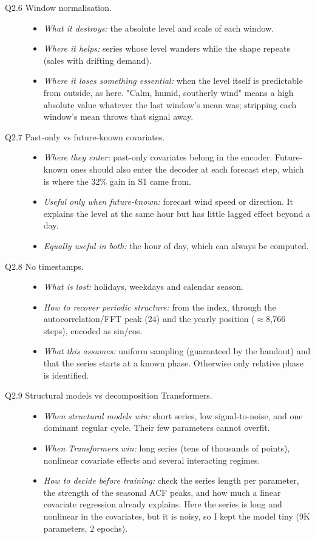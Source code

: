 \begin{description}
\item[Q2.6 Window normalisation.]
\begin{itemize}
\item \emph{What it destroys:} the absolute level and scale of each window.
\item \emph{Where it helps:} series whose level wanders while the shape repeats (sales with drifting demand).
\item \emph{Where it loses something essential:} when the level itself is predictable from outside, as here. "Calm, humid, southerly wind" means a high absolute value whatever the last window's mean was; stripping each window's mean throws that signal away.
\end{itemize}

\item[Q2.7 Past-only vs future-known covariates.]
\begin{itemize}
\item \emph{Where they enter:} past-only covariates belong in the encoder. Future-known ones should also enter the decoder at each forecast step, which is where the 32\% gain in S1 came from.
\item \emph{Useful only when future-known:} forecast wind speed or direction. It explains the level at the same hour but has little lagged effect beyond a day.
\item \emph{Equally useful in both:} the hour of day, which can always be computed.
\end{itemize}

\item[Q2.8 No timestamps.]
\begin{itemize}
\item \emph{What is lost:} holidays, weekdays and calendar season.
\item \emph{How to recover periodic structure:} from the index, through the autocorrelation/FFT peak (24) and the yearly position ($\approx$8,766 steps), encoded as sin/cos.
\item \emph{What this assumes:} uniform sampling (guaranteed by the handout) and that the series starts at a known phase. Otherwise only relative phase is identified.
\end{itemize}

\item[Q2.9 Structural models vs decomposition Transformers.]
\begin{itemize}
\item \emph{When structural models win:} short series, low signal-to-noise, and one dominant regular cycle. Their few parameters cannot overfit.
\item \emph{When Transformers win:} long series (tens of thousands of points), nonlinear covariate effects and several interacting regimes.
\item \emph{How to decide before training:} check the series length per parameter, the strength of the seasonal ACF peaks, and how much a linear covariate regression already explains. Here the series is long and nonlinear in the covariates, but it is noisy, so I kept the model tiny (9K parameters, 2 epochs).
\end{itemize}
\end{description}
